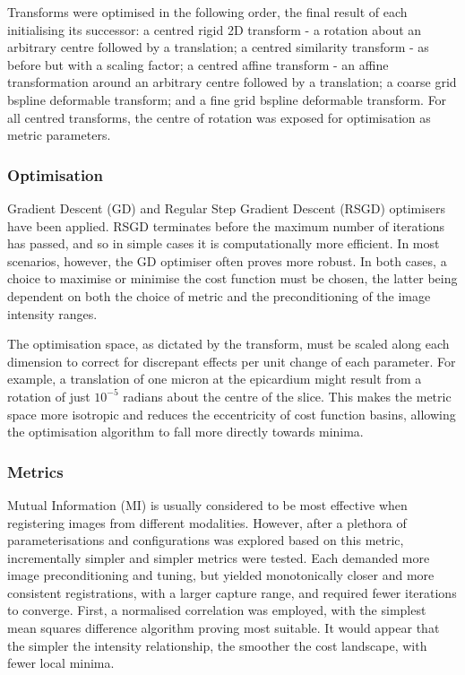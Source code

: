         Transforms were optimised in the following order, the final result of each initialising its successor: a centred rigid 2D transform - a rotation about an arbitrary centre followed by a translation; a centred similarity transform - as before but with a scaling factor; a centred affine transform - an affine transformation around an arbitrary centre followed by a translation; a coarse grid bspline deformable transform; and a fine grid bspline deformable transform. For all centred transforms, the centre of rotation was exposed for optimisation as metric parameters.
    
    \subsubsection{Optimisation} %
    \label{ssub:optimisation}
      Gradient Descent (GD) and Regular Step Gradient Descent (RSGD) optimisers have been applied. RSGD terminates before the maximum number of iterations has passed, and so in simple cases it is computationally more efficient. In most scenarios, however, the GD optimiser often proves more robust. In both cases, a choice to maximise or minimise the cost function must be chosen, the latter being dependent on both the choice of metric and the preconditioning of the image intensity ranges.

      The optimisation space, as dictated by the transform, must be scaled along each dimension to correct for discrepant effects per unit change of each parameter. For example, a translation of one micron at the epicardium might result from a rotation of just $10^{-5}$ radians about the centre of the slice. This makes the metric space more isotropic and reduces the eccentricity of cost function basins, allowing the optimisation algorithm to fall more directly towards minima.
    
    \subsubsection{Metrics} %
    \label{ssub:metrics}
      Mutual Information (MI) is usually considered to be most effective when registering images from different modalities. However, after a plethora of parameterisations and configurations was explored based on this metric, incrementally simpler and simpler metrics were tested. Each demanded more image preconditioning and tuning, but yielded monotonically closer and more consistent registrations, with a larger capture range, and required fewer iterations to converge. First, a normalised correlation was employed, with the simplest mean squares difference algorithm proving most suitable. It would appear that the simpler the intensity relationship, the smoother the cost landscape, with fewer local minima.
      
